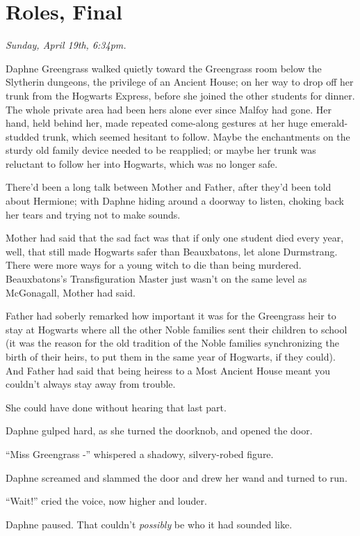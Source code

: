 \chapter{Roles, Final}\label{roles-final}

\emph{Sunday, April 19th, 6:34pm.}

Daphne Greengrass walked quietly toward the Greengrass room below the
Slytherin dungeons, the privilege of an Ancient House; on her way to
drop off her trunk from the Hogwarts Express, before she joined the
other students for dinner. The whole private area had been hers alone
ever since Malfoy had gone. Her hand, held behind her, made repeated
come-along gestures at her huge emerald-studded trunk, which seemed
hesitant to follow. Maybe the enchantments on the sturdy old family
device needed to be reapplied; or maybe her trunk was reluctant to
follow her into Hogwarts, which was no longer safe.

There'd been a long talk between Mother and Father, after they'd been
told about Hermione; with Daphne hiding around a doorway to listen,
choking back her tears and trying not to make sounds.

Mother had said that the sad fact was that if only one student died
every year, well, that still made Hogwarts safer than Beauxbatons, let
alone Durmstrang. There were more ways for a young witch to die than
being murdered. Beauxbatons's Transfiguration Master just wasn't on the
same level as McGonagall, Mother had said.

Father had soberly remarked how important it was for the Greengrass heir
to stay at Hogwarts where all the other Noble families sent their
children to school (it was the reason for the old tradition of the Noble
families synchronizing the birth of their heirs, to put them in the same
year of Hogwarts, if they could). And Father had said that being heiress
to a Most Ancient House meant you couldn't always stay away from
trouble.

She could have done without hearing that last part.

Daphne gulped hard, as she turned the doorknob, and opened the door.

``Miss Greengrass -'' whispered a shadowy, silvery-robed figure.

Daphne screamed and slammed the door and drew her wand and turned to
run.

``Wait!'' cried the voice, now higher and louder.

Daphne paused. That couldn't \emph{possibly} be who it had sounded like.

